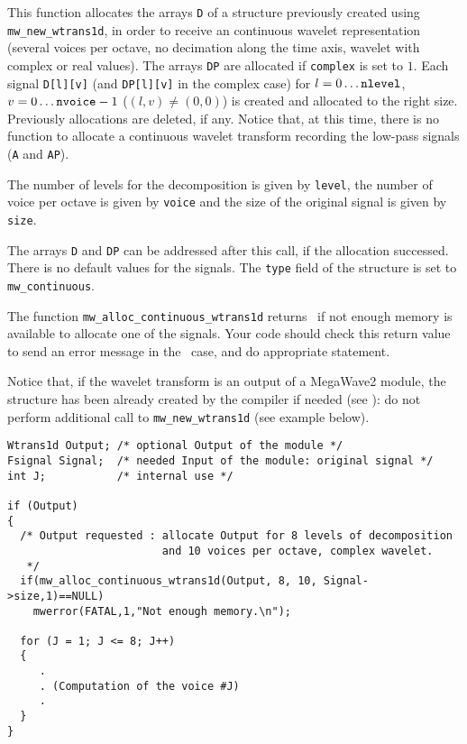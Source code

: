\Description
This function allocates the arrays \verb+D+ of a \wtransud structure previously created using \verb+mw_new_wtrans1d+, in order to receive
an continuous wavelet representation (several voices per octave, no decimation along the time axis, wavelet with complex or real values).
The arrays \verb+DP+ are allocated if \verb+complex+ is set to $1$.
Each signal \verb+D[l][v]+ (and \verb+DP[l][v]+ in the complex case) for $l=0 \ldots \mbox{{\tt nlevel}}$, $v=0 \ldots \mbox{{\tt nvoice}}-1$ ($(l,v) \not = (0,0)$) is created and
allocated to the right size.
Previously allocations are deleted, if any.
Notice that, at this time, there is no function to allocate a continuous wavelet transform recording the low-pass signals (\verb+A+ and \verb+AP+).

The number of levels for the decomposition is given by \verb+level+, the number of voice per octave is given by \verb+voice+ and the size of the original signal is given by \verb+size+.

The arrays \verb+D+ and \verb+DP+ can be addressed after this call, if the allocation successed. There is no default values for the signals.
The \verb+type+ field of the \wtransud structure is set to \verb+mw_continuous+.

The function \verb+mw_alloc_continuous_wtrans1d+ returns \Null\ if not enough memory is available to allocate one of the signals. 
Your code should check this return value to send an error message in the \Null\ case, and do appropriate statement.

Notice that, if the wavelet transform is an output of a MegaWave2 module, the structure has been already created by the compiler if needed (see \volI): do not perform additional call to \verb+mw_new_wtrans1d+ (see example below).

\Next
\Example
\begin{verbatim}
Wtrans1d Output; /* optional Output of the module */
Fsignal Signal;  /* needed Input of the module: original signal */
int J;           /* internal use */

if (Output) 
{
  /* Output requested : allocate Output for 8 levels of decomposition
                        and 10 voices per octave, complex wavelet.
   */
  if(mw_alloc_continuous_wtrans1d(Output, 8, 10, Signal->size,1)==NULL)
    mwerror(FATAL,1,"Not enough memory.\n");
  
  for (J = 1; J <= 8; J++)
  {
     .
     . (Computation of the voice #J)
     .
  }
}
\end{verbatim}

